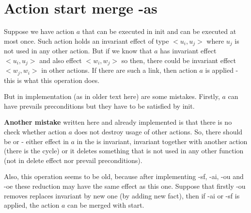 	\chapter{Action start merge -as}
	Suppose we have action $a$ that can be executed in init and can be executed at most once. Such action holds an invariant effect of type $<u_i,u_j>$ where $u_j$ is not used in any other action. But if we know that $a$ has invariant effect $<u_i,u_j>$ and also effect $<w_i,w_j>$ so then, there could be invariant effect $<w_j,w_i>$ in other actions. If there are such a link, then action $a$ is applied - this is what this operation does.
	
	But in implementation (as in older text here) are some mistakes. Firstly, $a$ can have prevails preconditions but they have to be satisfied by init.
	
	\textbf{Another mistake} written here and already implemented is that there is no check whether action $a$ does not destroy usage of other actions. So, there should be or - either effect in $a$ in the is invariant, invariant together with another action (there is the cycle) or it deletes something that is not used in any other function (not in delete effect nor prevail preconditions).
	
	Also, this operation seems to be old, because after implementing -sf, -ai, -ou and -oe these reduction may have the same effect as this one. Suppose that firstly -ou removes replaces invariant by new one (by adding new fact), then if -ai or -sf is applied, the action $a$ can be merged with start.
	

